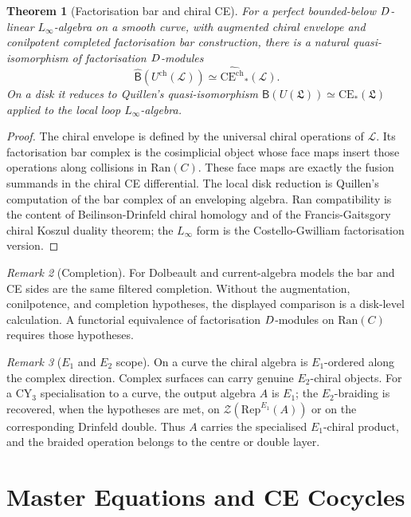 \documentclass[11pt]{amsart}
\providecommand{\Lfrak}{\mathfrak{L}}
\providecommand{\CE}{\mathrm{CE}}
\providecommand{\chCE}{\mathrm{CE}^{\mathrm{ch}}}
\providecommand{\cL}{\mathcal{L}}
\providecommand{\Ran}{\mathrm{Ran}}
\providecommand{\Uch}{U^{\mathrm{ch}}}
\providecommand{\barB}{\mathsf{B}}
\theoremstyle{plain}
\newtheorem{theorem}{Theorem}[section]
\theoremstyle{definition}
\theoremstyle{remark}
\newtheorem{remark}[theorem]{Remark}
\begin{document}
\begin{theorem}[Factorisation bar and chiral CE]
\label{thm:chce-bar}
For a perfect bounded-below $D$-linear $L_\infty$-algebra on a smooth
curve, with augmented chiral envelope and conilpotent completed
factorisation bar construction, there is a natural quasi-isomorphism of
factorisation $D$-modules
\[
  \widehat{\barB}(\Uch(\cL))
  \simeq
  \widehat{\chCE}_*(\cL).
\]
On a disk it reduces to Quillen's quasi-isomorphism
$\barB(U(\Lfrak))\simeq\CE_*(\Lfrak)$ applied to the local loop
$L_\infty$-algebra.
\end{theorem}

\begin{proof}
The chiral envelope is defined by the universal chiral operations of
$\cL$.  Its factorisation bar complex is the cosimplicial object whose
face maps insert those operations along collisions in $\Ran(C)$.  These
face maps are exactly the fusion summands in the chiral CE differential.
The local disk reduction is Quillen's computation of the bar complex of
an enveloping algebra.  Ran compatibility is the content of
Beilinson-Drinfeld chiral homology and of the
Francis-Gaitsgory chiral Koszul duality theorem; the
$L_\infty$ form is the Costello-Gwilliam factorisation version.
\end{proof}

\begin{remark}[Completion]
\label{rmk:bar-ce-completion}
For Dolbeault and current-algebra models the bar and CE sides are the
same filtered completion.  Without the augmentation, conilpotence, and
completion hypotheses, the displayed comparison is a disk-level
calculation.  A functorial equivalence of factorisation \(D\)-modules
on \(\Ran(C)\) requires those hypotheses.
\end{remark}

\begin{remark}[$E_1$ and $E_2$ scope]
\label{rmk:E1E2scope}
On a curve the chiral algebra is $E_1$-ordered along the complex
direction.  Complex surfaces can carry genuine $E_2$-chiral objects.
For a CY$_3$ specialisation to a curve, the output algebra $A$ is
$E_1$; the $E_2$-braiding is recovered, when the hypotheses are met, on
$\mathcal Z(\mathrm{Rep}^{E_1}(A))$ or on the corresponding Drinfeld
double.  Thus \(A\) carries the specialised \(E_1\)-chiral product, and
the braided operation belongs to the centre or double layer.
\end{remark}

\section{Master Equations and CE Cocycles}
\label{sec:master}
\end{document}
